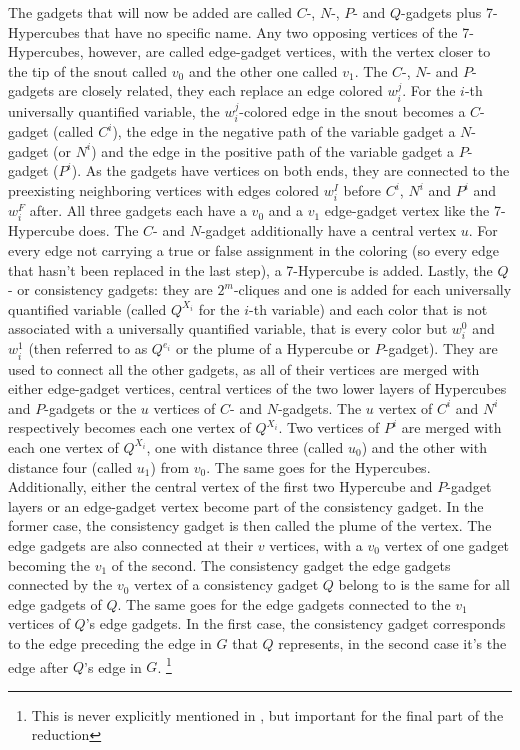 \documentclass[12pt,a4paper]{article}
\begin{document}
The gadgets that will now be added are called $C$-, $N$-, $P$- and $Q$-gadgets plus 7-Hypercubes that have no specific name. Any two opposing vertices of the 7-Hypercubes, however, are called edge-gadget vertices, with the vertex closer to the tip of the snout called $v_0$ and the other one called $v_1$. The $C$-, $N$- and $P$-gadgets are closely related, they each replace an edge colored $w^j_i$. For the $i$-th universally quantified variable, the $w^j_i$-colored edge in the snout becomes a $C$-gadget (called $C^i$), the edge in the negative path of the variable gadget a $N$-gadget (or $N^i$) and the edge in the positive path of the variable gadget a $P$-gadget ($P^i$). As the gadgets have vertices on both ends, they are connected to the preexisting neighboring vertices with edges colored $w^I_i$ before $C^i$, $N^i$ and $P^i$ and $w^F_i$ after. All three gadgets each have a $v_0$ and a $v_1$ edge-gadget vertex like the 7-Hypercube does. The $C$- and $N$-gadget additionally have a central vertex $u$. For every edge not carrying a true or false assignment in the coloring (so every edge that hasn't been replaced in the last step), a 7-Hypercube is added. 
\newline
Lastly, the $Q$- or consistency gadgets: they are $2^m$-cliques and one is added for each universally quantified variable (called $Q^{X_i}$ for the $i$-th variable) and each color that is not associated with a universally quantified variable, that is every color but $w^0_i$ and $w^1_i$ (then referred to as $Q^{e_i}$ or the plume of a Hypercube or $P$-gadget). They are used to connect all the other gadgets, as all of their vertices are merged with either edge-gadget vertices, central vertices of the two lower layers of Hypercubes and $P$-gadgets or the $u$ vertices of $C$- and $N$-gadgets. The $u$ vertex of $C^i$ and $N^i$ respectively becomes each one vertex of $Q^{X_i}$. Two vertices of $P^i$ are merged with each one vertex of $Q^{X_i}$, one with distance three (called $u_0$) and the other with distance four (called $u_1$) from $v_0$. The same goes for the Hypercubes. Additionally, either the central vertex of the first two Hypercube and $P$-gadget layers or an edge-gadget vertex become part of the consistency gadget. In the former case, the consistency gadget is then called the plume of the vertex.
\newline
The edge gadgets are also connected at their $v$ vertices, with a $v_0$ vertex of one gadget becoming the $v_1$ of the second. The consistency gadget the edge gadgets connected by the $v_0$ vertex of a consistency gadget $Q$ belong to is the same for all edge gadgets of $Q$. The same goes for the edge gadgets connected to the $v_1$ vertices of $Q$'s edge gadgets. In the first case, the consistency gadget corresponds to the edge preceding the edge in $G$ that $Q$ represents, in the second case it's the edge after $Q$'s edge in $G$. \footnote{This is never explicitly mentioned in \citep{Manin2008}, but important for the final part of the reduction}
\end{document}
